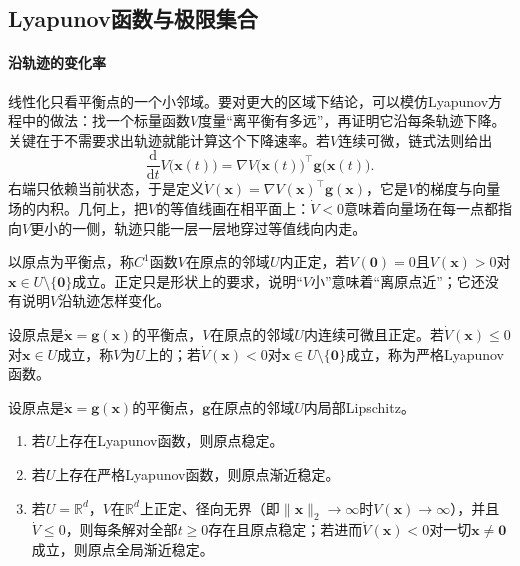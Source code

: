 \subsection{Lyapunov函数与极限集合}
\label{sec:ode-lyapunov}

\paragraph{沿轨迹的变化率}
线性化只看平衡点的一个小邻域。要对更大的区域下结论，可以模仿Lyapunov方程中的做法：找一个标量函数$V$度量“离平衡有多远”，再证明它沿每条轨迹下降。关键在于不需要求出轨迹就能计算这个下降速率。若$V$连续可微，链式法则给出
\[
  \frac{\mathrm d}{\mathrm dt}V\bigl(\bm x(t)\bigr)=\nabla V\bigl(\bm x(t)\bigr)^\top\bm g\bigl(\bm x(t)\bigr).
\]
右端只依赖当前状态，于是定义$\dot V(\bm x)=\nabla V(\bm x)^\top\bm g(\bm x)$，它是$V$的梯度与向量场的内积。几何上，把$V$的等值线画在相平面上：$\dot V<0$意味着向量场在每一点都指向$V$更小的一侧，轨迹只能一层一层地穿过等值线向内走。

以原点为平衡点，称$C^1$函数$V$在原点的邻域$U$内正定，若$V(\bm0)=0$且$V(\bm x)>0$对$\bm x\in U\setminus\{\bm0\}$成立。正定只是形状上的要求，说明“$V$小”意味着“离原点近”；它还没有说明$V$沿轨迹怎样变化。

\begin{definition}[Lyapunov函数]
  \label{def:ode-lyapunov-function}
  设原点是$\dot{\bm x}=\bm g(\bm x)$的平衡点，$V$在原点的邻域$U$内连续可微且正定。若$\dot V(\bm x)\leq0$对$\bm x\in U$成立，称$V$为$U$上的；若$\dot V(\bm x)<0$对$\bm x\in U\setminus\{\bm0\}$成立，称为严格Lyapunov函数。
\end{definition}

\begin{theorem}[连续时间Lyapunov判据]
  \label{thm:ode-lyapunov}
  \label{thm:dynamical-nonlinear-lyapunov}
  设原点是$\dot{\bm x}=\bm g(\bm x)$的平衡点，$\bm g$在原点的邻域$U$内局部Lipschitz。
  \begin{enumerate}
    \item 若$U$上存在Lyapunov函数，则原点稳定。
    \item 若$U$上存在严格Lyapunov函数，则原点渐近稳定。
    \item 若$U=\mathbb R^d$，$V$在$\mathbb R^d$上正定、径向无界（即$\|\bm x\|_2\to\infty$时$V(\bm x)\to\infty$），并且$\dot V\leq0$，则每条解对全部$t\geq0$存在且原点稳定；若进而$\dot V(\bm x)<0$对一切$\bm x\neq\bm0$成立，则原点全局渐近稳定。
  \end{enumerate}
\end{theorem}

